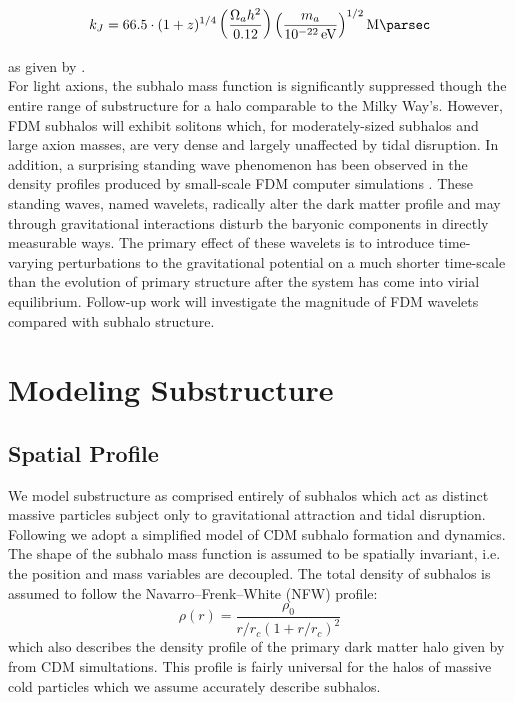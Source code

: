 \documentclass[usenatbib]{mnras}
\newcommand{\poweV}[1]{\SI{e#1}{\electronvolt}}
\begin{document}
\begin{equation}
k_J = 66.5 \cdot (1+z)^{1/4} \left( \frac{\Omega_a h^2}{0.12} \right) \left(\frac{m_a}{\poweV{-22}} \right)^{1/2} \si{\per\mega\parsec}
\end{equation}

as given by \citet{axion_cosmology}. \\ For light axions, the subhalo mass function is significantly suppressed though the entire range of substructure for a halo comparable to the Milky Way’s. However, FDM subhalos will exhibit solitons which, for moderately-sized subhalos and large axion masses, are very dense and largely unaffected by tidal disruption. In addition, a surprising standing wave phenomenon has been observed in the density profiles produced by small-scale FDM computer simulations \citep{cold_and_fuzzy}. These standing waves, named wavelets, radically alter the dark matter profile and may through gravitational interactions disturb the baryonic components in directly measurable ways. The primary effect of these wavelets is to introduce time-varying perturbations to the gravitational potential on a much shorter time-scale than the evolution of primary structure after the system has come into virial equilibrium. Follow-up work will investigate the magnitude of FDM wavelets compared with subhalo structure.  

\section{Modeling Substructure}
\subsection{Spatial Profile}
We model substructure as comprised entirely of subhalos which act as distinct massive particles subject only to gravitational attraction and tidal disruption. Following \citet{tidal_limit, unified_model} we adopt a
simplified model of CDM subhalo
formation and dynamics. The shape of
the subhalo mass function is assumed to
be spatially invariant, i.e. the position
and mass variables are decoupled. The
total density of subhalos is assumed to
follow the Navarro--Frenk--White (NFW) profile:
\begin{equation}
\rho(r) = \frac{\rho_0}{r/r_c (1+r/r_c)^2}
\end{equation} which also
describes the density profile of the
primary dark matter halo given by \citet{structure} from CDM simultations. This profile is fairly universal for the halos of massive cold particles which we assume accurately describe subhalos.
\end{document}
